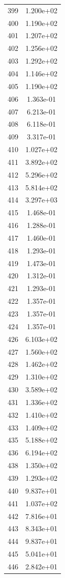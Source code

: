 \documentclass[12pt]{article}
\begin{document}
\begin{longtable}{@{}cc@{}}
399 & 1.200e+02 \\
400 & 1.190e+02 \\
401 & 1.207e+02 \\
402 & 1.256e+02 \\
403 & 1.292e+02 \\
404 & 1.146e+02 \\
405 & 1.190e+02 \\
406 & 1.363e-01 \\
407 & 6.213e-01 \\
408 & 6.118e-01 \\
409 & 3.317e-01 \\
410 & 1.027e+02 \\
411 & 3.892e+02 \\
412 & 5.296e+02 \\
413 & 5.814e+02 \\
414 & 3.297e+03 \\
415 & 1.468e-01 \\
416 & 1.288e-01 \\
417 & 1.460e-01 \\
418 & 1.293e-01 \\
419 & 1.473e-01 \\
420 & 1.312e-01 \\
421 & 1.293e-01 \\
422 & 1.357e-01 \\
423 & 1.357e-01 \\
424 & 1.357e-01 \\
426 & 6.103e+02 \\
427 & 1.560e+02 \\
428 & 1.462e+02 \\
429 & 1.310e+02 \\
430 & 3.589e+02 \\
431 & 1.336e+02 \\
432 & 1.410e+02 \\
433 & 1.409e+02 \\
435 & 5.188e+02 \\
436 & 6.194e+02 \\
438 & 1.350e+02 \\
439 & 1.293e+02 \\
440 & 9.837e+01 \\
441 & 1.037e+02 \\
442 & 7.816e+01 \\
443 & 8.343e+01 \\
444 & 9.837e+01 \\
445 & 5.041e+01 \\
446 & 2.842e+01 \\

\end{longtable}
\end{document}
